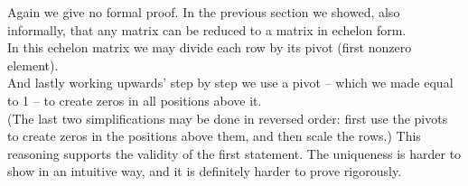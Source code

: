 \begin{rem}
\label{Rem:LinSystems:RowEquivalentToRREF}
Again we give no formal proof.
In the previous section we showed, also informally, that any matrix can be reduced to a matrix in echelon form. \\
In this echelon matrix we may divide each row by its pivot (first nonzero element). \\
And lastly working upwards' step by step we use a pivot -- which we made equal  to 1 -- to create zeros in all positions above it. \\
(The last two simplifications may be done in reversed order:  first use the pivots to create zeros in the positions above them, and then scale the rows.) 
This reasoning supports the validity of the first statement. 
The uniqueness is  harder to show in an intuitive way, and it is definitely harder to prove rigorously.
\end{rem}

